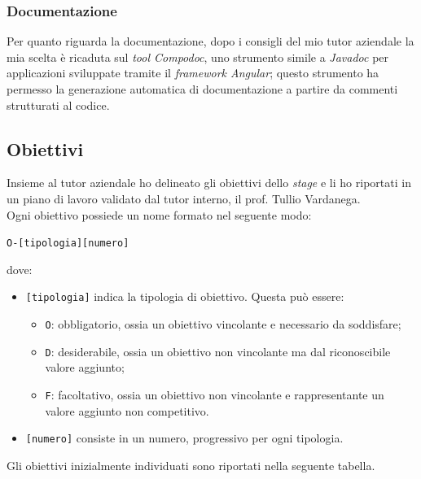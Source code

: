 \subsubsection*{Documentazione}
Per quanto riguarda la documentazione, dopo i consigli del mio tutor aziendale la mia scelta è ricaduta sul \textit{tool Compodoc}, uno strumento simile a \textit{Javadoc} per applicazioni sviluppate tramite il \textit{framework Angular}; questo strumento ha permesso la generazione automatica di documentazione a partire da commenti strutturati al codice.

\subsection{Obiettivi}

Insieme al tutor aziendale ho delineato gli obiettivi dello \textit{stage} e li ho riportati in un piano di lavoro validato dal tutor interno, il prof. Tullio Vardanega. \\
Ogni obiettivo possiede un nome formato nel seguente modo:
\begin{center}
  \centering
  \texttt{O-[tipologia][numero]}
\end{center} dove:
\begin{itemize}
  \item \texttt{[tipologia]} indica la tipologia di obiettivo. Questa può essere:
  \begin{itemize}
    \item \texttt{O}: obbligatorio, ossia un obiettivo vincolante e necessario da soddisfare;
    \item \texttt{D}: desiderabile, ossia un obiettivo non vincolante ma dal riconoscibile valore aggiunto;
    \item \texttt{F}: facoltativo, ossia un obiettivo non vincolante e rappresentante un valore aggiunto non competitivo.
  \end{itemize}
  \item \texttt{[numero]} consiste in un numero, progressivo per ogni tipologia.
\end{itemize}

Gli obiettivi inizialmente individuati sono riportati nella seguente tabella.
\newpage

